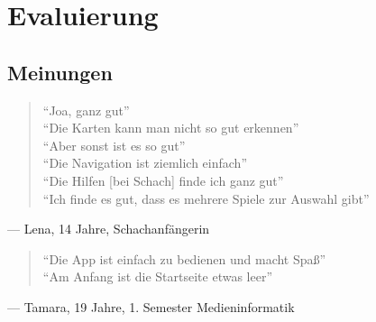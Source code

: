 \chapter{Evaluierung}

\section{Meinungen}

\begin{quote}
``Joa, ganz gut'' \\
``Die Karten kann man nicht so gut erkennen'' \\
``Aber sonst ist es so gut'' \\
``Die Navigation ist ziemlich einfach'' \\
``Die Hilfen [bei Schach] finde ich ganz gut'' \\
``Ich finde es gut, dass es mehrere Spiele zur Auswahl gibt''
\end{quote}
--- Lena, 14 Jahre, Schachanfängerin
\begin{quote}
``Die App ist einfach zu bedienen und macht Spaß'' \\
``Am Anfang ist die Startseite etwas leer'' 
\end{quote}
--- Tamara, 19 Jahre, 1. Semester Medieninformatik


